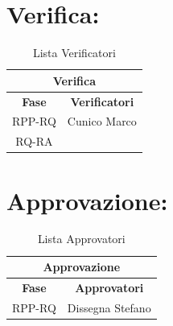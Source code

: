\section*{\LARGE Verifica:}
\begin{table}[!h]
	\begin{center}
		\begin{tabular}
			{|c|c|}
			\hline
			\multicolumn{2}{|c|}{ \textbf{Verifica} } \\
			\hline
			\textbf{Fase} & \textbf{Verificatori} \\
			\hline
			\multirow{1}{*}{RPP-RQ} &  Cunico Marco \\
									
			\hline
			\multirow{1}{*}{RQ-RA} & \\
									
			\hline
		\end{tabular}
		\caption{Lista Verificatori} %
		\label{tabverifica}
	\end{center}
\end{table}


  
\section*{\LARGE Approvazione:}
\begin{table}[!h]
  \begin{center}
    \begin{tabular}
      {|c|c|}
      \hline
      \multicolumn{2}{|c|}{ \textbf{Approvazione} } \\
      \hline
      \textbf{Fase} & \textbf{Approvatori} \\
      \hline
      \multirow{1}{*}{RPP-RQ} & Dissegna Stefano \\
                  
      \hline
    \end{tabular}
    \caption{Lista Approvatori} %
    \label{tabapprovazione}
  \end{center}
\end{table}
 
